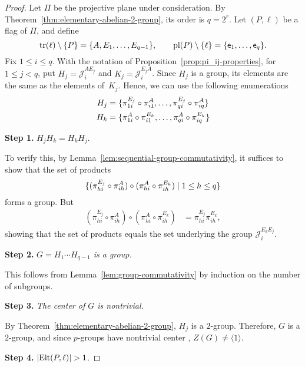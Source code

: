 \begin{proof}
    Let\/ $\Pi$ be the projective plane under consideration. By Theorem~\ref{thm:elementary-abelian-2-group}, its order is\/ $q=2^r$.  
    Let\/ $(P,\ell)$ be a flag of\/ $\Pi$, and define
    \[
        \operatorname{tr}(\ell)\setminus\{P\}=\{A,E_1,\dots,E_{q-1}\}, 
        \qquad
        \operatorname{pl}(P)\setminus\{\ell\}=\{\mathsf e_1,\dots,\mathsf e_q\}.
    \]
    Fix $1\le i\le q$. With the notation of Proposition~\ref{prop:pi_ij-properties}, for $1\le j<q$, put $H_j=\mathcal J_i^{AE_j}$ and $K_j=\mathcal J_i^{E_jA}$. Since $H_j$ is a group, its elements are the same as the elements of~$K_j$. Hence, we can use the following enumerations
    \begin{align*}
        H_j &= \{\pi_{1i}^{E_j}\circ\pi_{i1}^A,\dots,
            \pi_{qi}^{E_j}\circ\pi_{iq}^A\}\\
        H_k &= \{\pi_{1i}^A\circ\pi_{i1}^{E_k},\dots,
            \pi_{qi}^A\circ\pi_{iq}^{E_k}\}
    \end{align*}

    \medskip
    \textbf{Step 1.} $H_jH_k=H_kH_j$.

    To verify this, by Lemma~\ref{lem:sequential-group-commutativity}, it suffices to show that the set of products
    \[
        \{(\pi_{hi}^{E_j}\circ\pi_{ih}^A)\circ
        (\pi_{hi}^A\circ\pi_{ih}^{E_k})
        \mid1\le h\le q\}
    \]
    forms a group. But
    \begin{align*}
        (\pi_{hi}^{E_j}\circ\pi_{ih}^A)\circ
                (\pi_{hi}^A\circ\pi_{ih}^{E_k})
            &= \pi_{hi}^{E_j}\pi_{ih}^{E_k},
    \end{align*}
    showing that the set of products equals the set underlying the group $\mathcal J_i^{E_kE_j}$.

    \medskip

    \textbf{Step 2.} \textit{$G=H_1\cdots H_{q-1}$ is a group.}

    This follows from Lemma~\ref{lem:group-commutativity} by induction on the number of subgroups.

    \medskip

    \textbf{Step 3.} \textit{The center of\/ $G$ is nontrivial.}
    
    By Theorem~\ref{thm:elementary-abelian-2-group}, $H_j$ is a $2$-group. Therefore, $G$ is a $2$-group, and since $p$-groups have nontrivial center \citep{LC-Groups}, $Z(G)\ne\langle1\rangle$.

    \medskip

    \textbf{Step 4.} $|\Elt(P,\ell)|>1$.


\end{proof}
